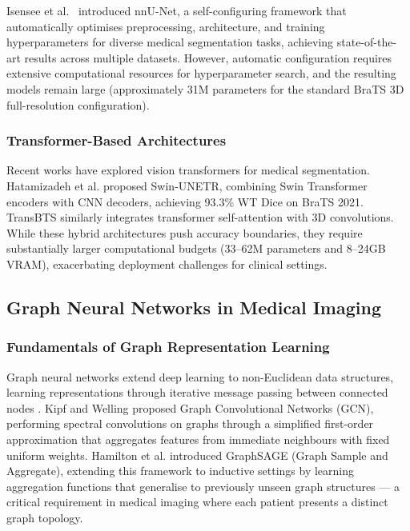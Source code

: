 \documentclass{article}
\begin{document}
Isensee et al.\ \cite{isensee2021nnunet} introduced nnU-Net, a self-configuring framework that automatically optimises preprocessing, architecture, and training hyperparameters for diverse medical segmentation tasks, achieving state-of-the-art results across multiple datasets. However, automatic configuration requires extensive computational resources for hyperparameter search, and the resulting models remain large (approximately 31M parameters for the standard BraTS 3D full-resolution configuration).

\subsubsection{Transformer-Based Architectures}

Recent works have explored vision transformers for medical segmentation. Hatamizadeh et al. \cite{hatamizadeh2022swin} proposed Swin-UNETR, combining Swin Transformer encoders with CNN decoders, achieving 93.3\% WT Dice on BraTS 2021. TransBTS \cite{wang2021transbts} similarly integrates transformer self-attention with 3D convolutions. While these hybrid architectures push accuracy boundaries, they require substantially larger computational budgets (33--62M parameters and 8--24GB VRAM), exacerbating deployment challenges for clinical settings.

\subsection{Graph Neural Networks in Medical Imaging}

\subsubsection{Fundamentals of Graph Representation Learning}

Graph neural networks extend deep learning to non-Euclidean data structures, learning representations through iterative message passing between connected nodes \cite{hamilton2017graphsage, kipf2017gcn}. Kipf and Welling \cite{kipf2017gcn} proposed Graph Convolutional Networks (GCN), performing spectral convolutions on graphs through a simplified first-order approximation that aggregates features from immediate neighbours with fixed uniform weights. Hamilton et al. \cite{hamilton2017graphsage} introduced GraphSAGE (Graph Sample and Aggregate), extending this framework to inductive settings by learning aggregation functions that generalise to previously unseen graph structures — a critical requirement in medical imaging where each patient presents a distinct graph topology.
\end{document}
